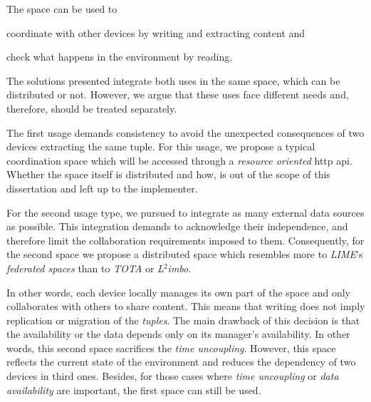 The space can be used to
\begin{enumerate*}[label=\itshape(\arabic*\upshape)]
  \item coordinate with other devices by writing and extracting content and
  \item check what happens in the environment by reading.
\end{enumerate*}
The solutions presented integrate both uses in the same space, which can be distributed or not.
However, we argue that these uses face different needs and, therefore, should be treated separately.


The first usage demands consistency to avoid the unexpected consequences of two devices extracting the same tuple.
For this usage, we propose a typical coordination space which will be accessed through a \emph{resource oriented} \ac{http} \ac{api}.
Whether the space itself is distributed and how, is out of the scope of this dissertation and left up to the implementer.


For the second usage type, we pursued to integrate as many external data sources as possible.
This integration demands to acknowledge their independence, and therefore limit the collaboration requirements imposed to them.
Consequently, for the second space we propose a distributed space which resembles more to \emph{LIME}'s \emph{federated spaces} than to \emph{TOTA} or \emph{L$^2$imbo}.


In other words, each device locally manages its own part of the space and only collaborates with others to share content.
This means that writing does not imply replication or migration of the \emph{tuples}.
The main drawback of this decision is that the availability or the data depends only on its manager's availability.
In other words, this second space sacrifices the \emph{time uncoupling}.
However, this space reflects the current state of the environment and reduces the dependency of two devices in third ones.
Besides, for those cases where \emph{time uncoupling} or \emph{data availability} are important, the first space can still be used.